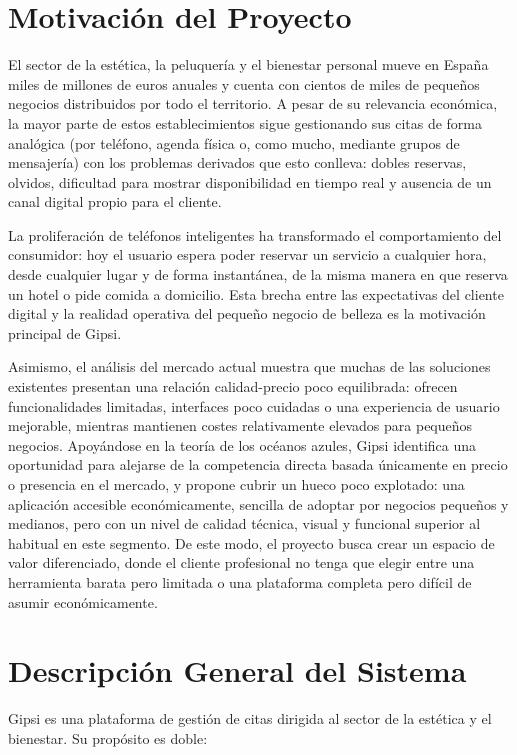 \documentclass[12pt,a4paper,twoside]{report}
\begin{document}
\section{Motivación del Proyecto}

El sector de la estética, la peluquería y el bienestar personal mueve en España miles de millones de euros anuales y cuenta con cientos de miles de pequeños negocios distribuidos por todo el territorio. A pesar de su relevancia económica, la mayor parte de estos establecimientos sigue gestionando sus citas de forma analógica (por teléfono, agenda física o, como mucho, mediante grupos de mensajería) con los problemas derivados que esto conlleva: dobles reservas, olvidos, dificultad para mostrar disponibilidad en tiempo real y ausencia de un canal digital propio para el cliente.

La proliferación de teléfonos inteligentes ha transformado el comportamiento del consumidor: hoy el usuario espera poder reservar un servicio a cualquier hora, desde cualquier lugar y de forma instantánea, de la misma manera en que reserva un hotel o pide comida a domicilio. Esta brecha entre las expectativas del cliente digital y la realidad operativa del pequeño negocio de belleza es la motivación principal de Gipsi.

Asimismo, el análisis del mercado actual muestra que muchas de las soluciones existentes presentan una relación calidad-precio poco equilibrada: ofrecen funcionalidades limitadas, interfaces poco cuidadas o una experiencia de usuario mejorable, mientras mantienen costes relativamente elevados para pequeños negocios. Apoyándose en la teoría de los océanos azules, Gipsi identifica una oportunidad para alejarse de la competencia directa basada únicamente en precio o presencia en el mercado, y propone cubrir un hueco poco explotado: una aplicación accesible económicamente, sencilla de adoptar por negocios pequeños y medianos, pero con un nivel de calidad técnica, visual y funcional superior al habitual en este segmento. De este modo, el proyecto busca crear un espacio de valor diferenciado, donde el cliente profesional no tenga que elegir entre una herramienta barata pero limitada o una plataforma completa pero difícil de asumir económicamente.

\section{Descripción General del Sistema}

Gipsi es una plataforma de gestión de citas dirigida al sector de la estética y el bienestar. Su propósito es doble:
\end{document}
